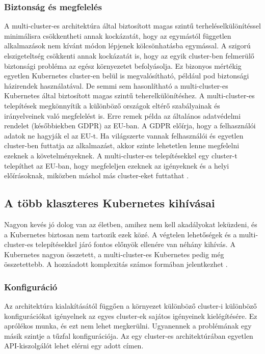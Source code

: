 \subsubsection*{Biztonság és megfelelés}
A multi-cluster-es architektúra által biztosított magas szintű terheléselkülönítéssel minimálisra csökkentheti annak kockázatát, hogy az egymástól független alkalmazások nem kívánt módon lépjenek kölcsönhatásba egymással.
A szigorú elszigeteltség csökkenti annak kockázatát is, hogy az egyik cluster-ben felmerülő biztonsági probléma az egész környezetet befolyásolja.
Ez bizonyos mértékig egyetlen Kubernetes cluster-en belül is megvalósítható, például pod biztonsági házirendek használatával.
De semmi sem hasonlítható a multi-cluster-es Kubernetes által biztosított magas szintű teherelkülönítéshez.
A multi-cluster-es telepítések megkönnyítik a különböző országok eltérő szabályainak és irányelveinek való megfelelést is.
Erre remek példa az általános adatvédelmi rendelet (későbbiekben GDPR) az EU-ban.
A GDPR előírja, hogy a felhasználói adatok ne hagyják el az EU-t.
Ha világszerte vannak felhasználói és egyetlen cluster-ben futtatja az alkalmazást, akkor szinte lehetetlen lenne megfelelni ezeknek a követelményeknek.
A multi-cluster-es telepítésekkel egy cluster-t telepíthet az EU-ban, hogy megfeleljen ezeknek az igényeknek és a helyi előírásoknak, miközben máshol más cluster-eket futtathat \cite{multicluster}.

\subsection{A több klaszteres Kubernetes kihívásai}
Nagyon kevés jó dolog van az életben, amihez nem kell akadályokat leküzdeni, és a Kubernetes biztosan nem tartozik ezek közé.
A végtelen lehetőségek és a multi-cluster-es telepítésekkel járó fontos előnyök ellenére van néhány kihívás.
A Kubernetes nagyon összetett, a multi-cluster-es Kubernetes pedig még összetettebb. A hozzáadott komplexitás számos formában jelentkezhet \cite{multicluster}.

\subsubsection*{Konfiguráció}
Az architektúra kialakításától függően a környezet különböző cluster-i különböző konfigurációkat igényelnek az egyes cluster-ek sajátos igényeinek kielégítésére.
Ez aprólékos munka, és ezt nem lehet megkerülni. Ugyanennek a problémának egy másik szintje a tűzfal konfigurációja.
Az egy cluster-es architektúrában egyetlen API-kiszolgálót lehet elérni egy adott címen.

